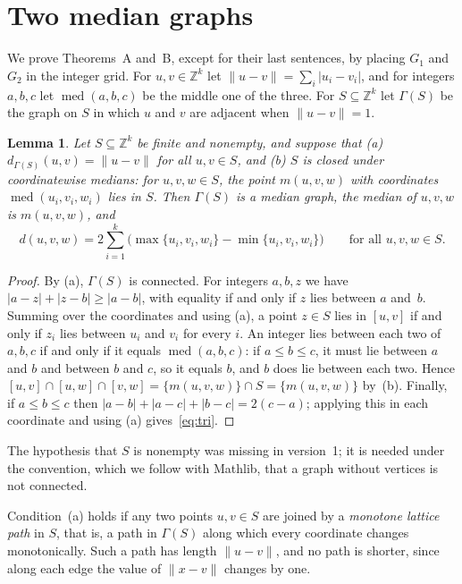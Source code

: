 \documentclass[11pt]{article}
\newtheorem{lemma}[theorem]{Lemma}
\theoremstyle{remark}
\DeclareMathOperator{\med}{med}
\begin{document}
\section{Two median graphs}\label{sec:median}
We prove Theorems~A and~B, except for their last sentences, by placing $G_1$
and $G_2$ in the integer grid. For $u,v\in\mathbb Z^k$ let
$\|u-v\|=\sum_i|u_i-v_i|$, and for integers $a,b,c$ let $\med(a,b,c)$ be the
middle one of the three. For $S\subseteq\mathbb Z^k$ let $\Gamma(S)$ be the
graph on $S$ in which $u$ and $v$ are adjacent when $\|u-v\|=1$.

\begin{lemma}\label{lem:grid}
Let $S\subseteq\mathbb Z^k$ be finite and nonempty, and suppose that
\textup{(a)} $d_{\Gamma(S)}(u,v)=\|u-v\|$ for all $u,v\in S$, and
\textup{(b)} $S$ is closed under coordinatewise medians: for $u,v,w\in S$, the
point $m(u,v,w)$ with coordinates $\med(u_i,v_i,w_i)$ lies in $S$. Then
$\Gamma(S)$ is a median graph, the median of $u,v,w$ is $m(u,v,w)$, and
\begin{equation}\label{eq:tri}
 d(u,v,w)=2\sum_{i=1}^k\bigl(\max\{u_i,v_i,w_i\}-\min\{u_i,v_i,w_i\}\bigr)
 \qquad\text{for all }u,v,w\in S.
\end{equation}
\end{lemma}
\begin{proof}
By (a), $\Gamma(S)$ is connected. For integers $a,b,z$ we have
$|a-z|+|z-b|\ge|a-b|$, with equality if and only if $z$ lies between $a$
and~$b$. Summing over the coordinates and using (a), a point $z\in S$ lies in
$[u,v]$ if and only if $z_i$ lies between $u_i$ and $v_i$ for every $i$. An
integer lies between each two of $a,b,c$ if and only if it equals
$\med(a,b,c)$: if $a\le b\le c$, it must lie between $a$ and $b$ and between
$b$ and $c$, so it equals $b$, and $b$ does lie between each two. Hence
$[u,v]\cap[u,w]\cap[v,w]=\{m(u,v,w)\}\cap S=\{m(u,v,w)\}$ by~(b). Finally, if
$a\le b\le c$ then $|a-b|+|a-c|+|b-c|=2(c-a)$; applying this in each
coordinate and using (a) gives~\eqref{eq:tri}.
\end{proof}

The hypothesis that $S$ is nonempty was missing in version~1; it is needed
under the convention, which we follow with Mathlib, that a graph without
vertices is not connected.

Condition~(a) holds if any two points $u,v\in S$ are joined by a
\emph{monotone lattice path} in $S$, that is, a path in $\Gamma(S)$ along which
every coordinate changes monotonically. Such a path has length $\|u-v\|$, and
no path is shorter, since along each edge the value of $\|x-v\|$ changes by
one.
\end{document}
